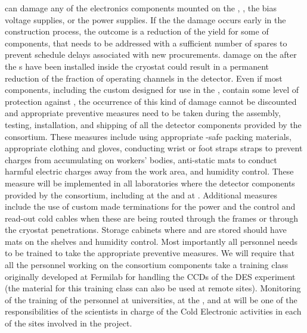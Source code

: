  can damage any of the electronics
components mounted on the , ,
the bias voltage supplies, or the power supplies. If the
the damage occurs early in the construction process, 
the outcome is a reduction
of the yield for some of components, that needs to be
addressed with a sufficient number of spares to prevent
schedule delays associated with new procurements. 
damage on the  after the s have been
installed inside the cryostat could result in a permanent
reduction of the fraction of operating channels in the
detector. Even if most components, including the custom 
 designed for use in the , contain 
some level of protection  against , the occurrence 
of this kind of damage cannot be discounted and appropriate 
preventive measures need to be taken during the 
assembly, testing, installation, and shipping of all the detector 
components provided by the  consortium. These 
measures include using appropriate -safe packing materials, 
appropriate clothing and gloves, conducting wrist or foot straps 
straps to prevent charges from accumulating 
on workers' bodies, anti-static mats to conduct harmful electric 
charges away from the work area, and humidity control. These
measure will be implemented in all laboratories where the
detector components provided by the  consortium,
including at the  and at \surf. Additional measures
include the use of custom made terminations for the
power and the control and read-out cold cables when these
are being routed through the  frames or through the
cryostat penetrations. Storage cabinets where  and
 are stored should have  mats
on the shelves and humidity control. Most importantly all personnel needs 
to be trained to take the appropriate preventive measures. We 
will require that all the personnel working on the  
consortium components take a training class originally developed 
at Fermilab for handling the CCDs of the DES experiment (the 
material for this training class can also be used at remote 
sites). Monitoring of the training of the personnel at universities, 
at the , and at \surf will be one of the responsibilities 
of the scientists in charge of the Cold Electronic activities in
each of the sites involved in the project.


